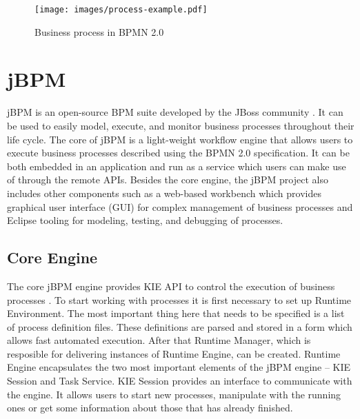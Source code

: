 \documentclass[12pt,oneside,final]{fithesis2}
\begin{document}
\begin{figure}[ht!]
\centering
\texttt{[image: images/process-example.pdf]}
\caption{Business process in BPMN 2.0}
\label{fig:process-example}
\end{figure}

\section{jBPM}
jBPM is an open-source BPM suite developed by the JBoss community \cite{jbpm6overview}.
It can be used to easily model, execute, and monitor business processes throughout their life cycle.
The core of jBPM is a light-weight workflow engine that allows users to execute business processes described using the BPMN 2.0 specification.
It can be both embedded in an application and run as a service which users can make use of through the remote APIs.
Besides the core engine, the jBPM project also includes other components such as a web-based workbench which provides graphical user interface (GUI) for complex management of business processes and Eclipse\footnotemark{} tooling for modeling, testing, and debugging of processes.

\subsection{Core Engine}
\label{subsec:core-engine}
The core jBPM engine provides KIE\footnotemark{} API to control the execution of business processes \cite{jbpm6api,jbpm6engine}.
To start working with processes it is first necessary to set up Runtime Environment.
The most important thing here that needs to be specified is a list of process definition files.
These definitions are parsed and stored in a form which allows fast automated execution.
After that Runtime Manager, which is resposible for delivering instances of Runtime Engine, can be created.
Runtime Engine encapsulates the two most important elements of the jBPM engine -- KIE Session and Task Service.
KIE Session provides an interface to communicate with the engine.
It allows users to start new processes, manipulate with the running ones or get some information about those that has already finished.
\end{document}
